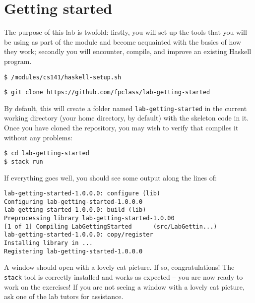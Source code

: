 \section{Getting started}

The purpose of this lab is twofold: firstly, you will set up the tools that you will be using as part of the module and become acquainted with the basics of how they work; secondly you will encounter, compile, and improve an existing Haskell program.


\begin{verbatim}
$ /modules/cs141/haskell-setup.sh
\end{verbatim}

\taskLine

\begin{verbatim}
$ git clone https://github.com/fpclass/lab-getting-started
\end{verbatim}
By default, this will create a folder named \texttt{\small lab-getting-started} in the current working directory (your home directory, by default) with the skeleton code in it. Once you have cloned the repository, you may wish to verify that  compiles it without any problems:
\begin{verbatim}
$ cd lab-getting-started
$ stack run
\end{verbatim}
If everything goes well, you should see some output along the lines of:
\begin{verbatim}
lab-getting-started-1.0.0.0: configure (lib)
Configuring lab-getting-started-1.0.0.0
lab-getting-started-1.0.0.0: build (lib)
Preprocessing library lab-getting-started-1.0.00
[1 of 1] Compiling LabGettingStarted      (src/LabGettin...)
lab-getting-started-1.0.0.0: copy/register
Installing library in ...
Registering lab-getting-started-1.0.0.0
\end{verbatim}
A window should open with a lovely cat picture. If so, congratulations! The \texttt{\small stack} tool is correctly installed and works as expected -- you are now ready to work on the exercises! If you are not seeing a window with a lovely cat picture, ask one of the lab tutors for assistance.

